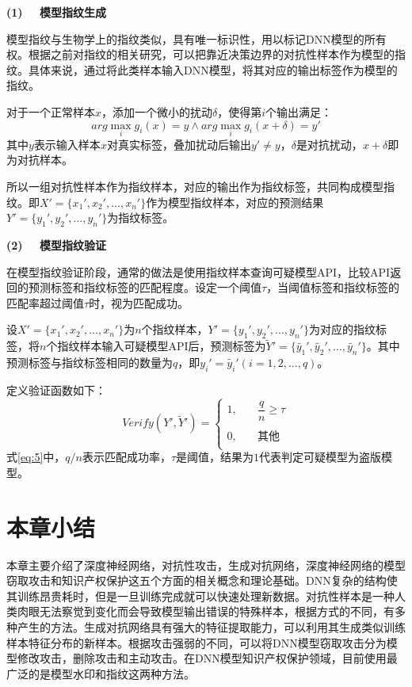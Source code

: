 \noindent\textbf{(1) \ \ 模型指纹生成}

模型指纹与生物学上的指纹类似，具有唯一标识性，用以标记DNN模型的所有权。根据之前对指纹的相关研究\cite{zhao2020afa,lukas2019deep,cao2021ipguard}，可以把靠近决策边界的对抗性样本作为模型的指纹。具体来说，通过将此类样本输入DNN模型，将其对应的输出标签作为模型的指纹。

对于一个正常样本$x$，添加一个微小的扰动$\delta$，使得第$i$个输出满足：
\begin{equation}
	\label{eq:4}
	arg \mathop{max} \limits_i g_i(x) = y \wedge arg \mathop{max} \limits_i g_i(x + \delta) = y'
\end{equation}
其中$y$表示输入样本$x$对真实标签，叠加扰动后输出$y' \neq y$，$\delta$是对抗扰动，$x + \delta$即为对抗样本。

所以一组对抗性样本作为指纹样本，对应的输出作为指纹标签，共同构成模型指纹。即$X' = \{x_1',x_2',...,x_n'\}$作为模型指纹样本，对应的预测结果$Y' = \{y_1', y_2',...,y_n'\}$为指纹标签。

\noindent\textbf{(2) \ \ 模型指纹验证}

在模型指纹验证阶段，通常的做法是使用指纹样本查询可疑模型API，比较API返回的预测标签和指纹标签的匹配程度。设定一个阈值$\tau$，当阈值标签和指纹标签的匹配率超过阈值$\tau$时，视为匹配成功。

设$X' = \{x_1',x_2',...,x_n'\}$为$n$个指纹样本，$Y' = \{y_1', y_2',...,y_n'\}$为对应的指纹标签，将$n$个指纹样本输入可疑模型API后，预测标签为$\widetilde{Y}' = \{\widetilde{y_1}', \widetilde{y_2}',...,\widetilde{y_n}'\}$。其中预测标签与指纹标签相同的数量为$q$，即$y_i' = \widetilde{y_i}'(i = 1, 2,...,q)$。

定义验证函数如下：
\begin{equation}
	\label{eq:5}
	Verify(Y', \widetilde{Y}')= \left
	\{ 
	\begin{array}{ll} 
		1, &\quad \dfrac{q}{n} \geq \tau \\ 
		\\
		0, &\quad \mbox{其他}\\ 
	\end{array} 
	\right.
\end{equation}
式\ref{eq:5}中，$q/n$表示匹配成功率，$\tau$是阈值，结果为$1$代表判定可疑模型为盗版模型。


\section{本章小结}

本章主要介绍了深度神经网络，对抗性攻击，生成对抗网络，深度神经网络的模型窃取攻击和知识产权保护这五个方面的相关概念和理论基础。DNN复杂的结构使其训练昂贵耗时，但是一旦训练完成就可以快速处理新数据。对抗性样本是一种人类肉眼无法察觉到变化而会导致模型输出错误的特殊样本，根据方式的不同，有多种产生的方法。生成对抗网络具有强大的特征提取能力，可以利用其生成类似训练样本特征分布的新样本。根据攻击强弱的不同，可以将DNN模型窃取攻击分为模型修改攻击，删除攻击和主动攻击。在DNN模型知识产权保护领域，目前使用最广泛的是模型水印和指纹这两种方法。
